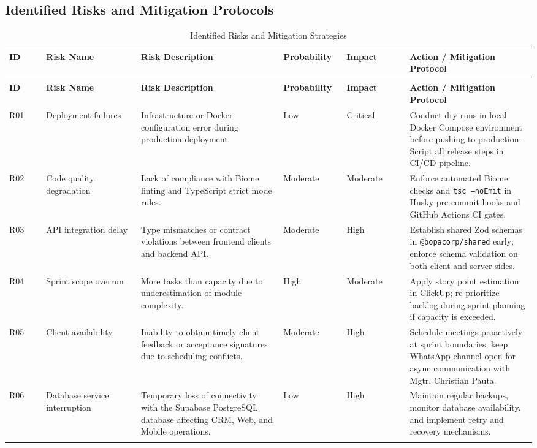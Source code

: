 \documentclass[letterpaper%
, oneside%
, 12pt%
, memoireprojet%
, english%
,creativecommons,hyperref, withAlgo2e %
]{thETS}
\begin{document}
\subsection{Identified Risks and Mitigation Protocols}
\begingroup
\setlength{\LTleft}{-1.5cm plus -1fill}
\setlength{\LTright}{\LTleft}
\begin{longtable}{|>{\centering\arraybackslash}p{0.07\linewidth}|>{\arraybackslash}p{0.18\linewidth}|>{\arraybackslash}p{0.27\linewidth}|>{\centering\arraybackslash}p{0.12\linewidth}|>{\centering\arraybackslash}p{0.12\linewidth}|>{\arraybackslash}p{0.24\linewidth}|}
\hline
\textbf{ID} & \textbf{Risk Name} & \textbf{Risk Description} & \textbf{Probability} & \textbf{Impact} & \textbf{Action / Mitigation Protocol} \\ \hline
\endfirsthead
\multicolumn{6}{l}{\textit{Table continued from previous page}} \\ \hline
\textbf{ID} & \textbf{Risk Name} & \textbf{Risk Description} & \textbf{Probability} & \textbf{Impact} & \textbf{Action / Mitigation Protocol} \\ \hline
\endhead
R01 & Deployment failures & Infrastructure or Docker configuration error during production deployment. & Low & Critical & Conduct dry runs in local Docker Compose environment before pushing to production. Script all release steps in CI/CD pipeline. \\ \hline
R02 & Code quality degradation & Lack of compliance with Biome linting and TypeScript strict mode rules. & Moderate & Moderate & Enforce automated Biome checks and \texttt{tsc --noEmit} in Husky pre-commit hooks and GitHub Actions CI gates. \\ \hline
R03 & API integration delay & Type mismatches or contract violations between frontend clients and backend API. & Moderate & High & Establish shared Zod schemas in \texttt{@bopacorp/shared} early; enforce schema validation on both client and server sides. \\ \hline
R04 & Sprint scope overrun & More tasks than capacity due to underestimation of module complexity. & High & Moderate & Apply story point estimation in ClickUp; re-prioritize backlog during sprint planning if capacity is exceeded. \\ \hline
R05 & Client availability & Inability to obtain timely client feedback or acceptance signatures due to scheduling conflicts. & Moderate & High & Schedule meetings proactively at sprint boundaries; keep WhatsApp channel open for async communication with Mgtr. Christian Pauta. \\ \hline
R06 & Database service interruption & Temporary loss of connectivity with the Supabase PostgreSQL database affecting CRM, Web, and Mobile operations. & Low & High & Maintain regular backups, monitor database availability, and implement retry and recovery mechanisms.  \\ \hline
\caption{Identified Risks and Mitigation Strategies}
\label{tab:identified_risks}
\end{longtable}
\endgroup
\end{document}
